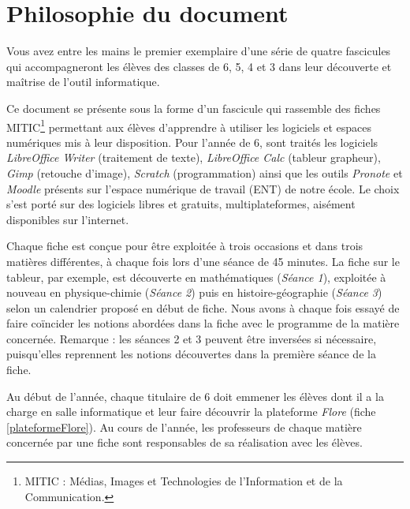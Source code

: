 \chapter*{Philosophie du document}



Vous avez entre les mains le premier exemplaire d'une série de quatre fascicules qui accompagneront les élèves des classes de 6, 5, 4 et 3 dans leur découverte et maîtrise de l'outil informatique.

\vspace{18pt}

Ce document se présente sous la forme d'un fascicule qui rassemble des fiches MITIC\footnote{MITIC : Médias, Images et Technologies de l'Information et de la Communication.} permettant aux élèves d'apprendre à utiliser les logiciels et espaces numériques mis à leur disposition. Pour l'année de 6, sont traités les logiciels \emph{LibreOffice Writer} (traitement de texte), \emph{LibreOffice Calc} (tableur grapheur), \emph{Gimp} (retouche d'image), \emph{Scratch} (programmation) ainsi que les outils \emph{Pronote} et \emph{Moodle} présents sur l'espace numérique de travail (ENT) de notre école. Le choix s'est porté sur des logiciels libres et gratuits, multiplateformes, aisément disponibles sur l'internet.

\vspace{18pt}


Chaque fiche est conçue pour être exploitée à trois occasions et dans trois matières différentes, à chaque fois lors d'une séance de 45 minutes. La fiche sur le tableur, par exemple, est découverte en mathématiques (\emph{Séance 1}), exploitée à nouveau en physique-chimie (\emph{Séance 2}) puis en histoire-géographie (\emph{Séance 3}) selon un calendrier proposé en début de fiche. Nous avons à chaque fois essayé de faire coïncider les notions abordées dans la fiche avec le programme de la matière concernée. Remarque : les séances 2 et 3 peuvent être inversées si nécessaire, puisqu'elles reprennent les notions découvertes dans la première séance de la fiche.

\vspace{18pt}

Au début de l'année, chaque titulaire de 6 doit emmener les élèves dont il a la charge en salle informatique et leur faire découvrir la plateforme \emph{Flore} (fiche \vref{plateformeFlore}). Au cours de l'année, les professeurs de chaque matière concernée par une fiche sont responsables de sa réalisation avec les élèves.

